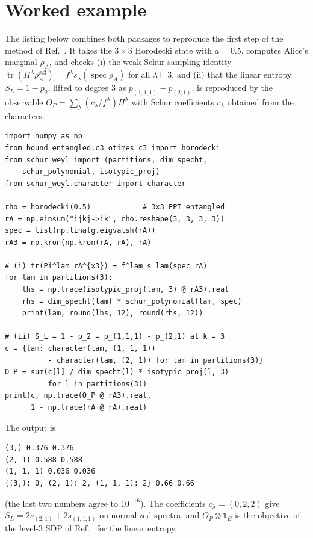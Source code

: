 \documentclass[aps,pra,twocolumn,superscriptaddress,groupedaddress]{revtex4-2}
\newcommand{\one}{\mathds{1}}
\DeclareMathOperator{\tr}{tr}
\DeclareMathOperator{\spec}{spec}
\begin{document}
\section{Worked example}\label{sec:example}

The listing below combines both packages to reproduce the first step of the
method of Ref.~\cite{mainpaper}. It takes the $3\times3$ Horodecki state with
$a=0.5$, computes Alice's marginal $\rho_A$, and checks (i) the weak Schur
sampling identity $\tr(\Pi^\lambda\rho_A^{\otimes3})=f^\lambda
s_\lambda(\spec\rho_A)$ for all $\lambda\vdash3$, and (ii) that the linear
entropy $S_L=1-p_2$, lifted to degree $3$ as $p_{(1,1,1)}-p_{(2,1)}$, is
reproduced by the observable $O_P=\sum_\lambda (c_\lambda/f^\lambda)\Pi^\lambda$
with Schur coefficients $c_\lambda$ obtained from the characters.

\begin{lstlisting}
import numpy as np
from bound_entangled.c3_otimes_c3 import horodecki
from schur_weyl import (partitions, dim_specht,
    schur_polynomial, isotypic_proj)
from schur_weyl.character import character

rho = horodecki(0.5)            # 3x3 PPT entangled
rA = np.einsum("ijkj->ik", rho.reshape(3, 3, 3, 3))
spec = list(np.linalg.eigvalsh(rA))
rA3 = np.kron(np.kron(rA, rA), rA)

# (i) tr(Pi^lam rA^{x3}) = f^lam s_lam(spec rA)
for lam in partitions(3):
    lhs = np.trace(isotypic_proj(lam, 3) @ rA3).real
    rhs = dim_specht(lam) * schur_polynomial(lam, spec)
    print(lam, round(lhs, 12), round(rhs, 12))

# (ii) S_L = 1 - p_2 = p_(1,1,1) - p_(2,1) at k = 3
c = {lam: character(lam, (1, 1, 1))
          - character(lam, (2, 1)) for lam in partitions(3)}
O_P = sum(c[l] / dim_specht(l) * isotypic_proj(l, 3)
          for l in partitions(3))
print(c, np.trace(O_P @ rA3).real,
      1 - np.trace(rA @ rA).real)
\end{lstlisting}

The output is
\begin{lstlisting}[language={}]
(3,) 0.376 0.376
(2, 1) 0.588 0.588
(1, 1, 1) 0.036 0.036
{(3,): 0, (2, 1): 2, (1, 1, 1): 2} 0.66 0.66
\end{lstlisting}
(the last two numbers agree to $10^{-16}$). The coefficients
$c_\lambda=(0,2,2)$ give $S_L=2s_{(2,1)}+2s_{(1,1,1)}$ on normalized spectra,
and $O_P\otimes\one_B$ is the objective of the level-3 SDP of
Ref.~\cite{mainpaper} for the linear entropy.
\end{document}
